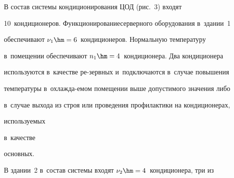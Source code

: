   




  

  В состав системы кондиционирования ЦОД (рис.~3) входят 

10~кондиционеров. Функционирование\linebreak серверного оборудования в~здании~1\linebreak 

обеспечивают $\nu_1\hm = 6$~кондиционеров. Нормальную температуру\linebreak 

в~помещении обес\-пе\-чи\-ва\-ют $n_1\hm = 4$~кондиционера. Два кондиционера

используются в~качестве ре-\linebreak зервных \mbox{и~подключаются} в~случае повышения 

температуры в~охлаж\-да-\linebreak емом помещении выше допустимого значения либо 

в~случае выхода из строя или проведения профилактики на кондиционерах, 

используемых

 в~качестве\hspace*{72.5mm}\linebreak

  основных.\hspace*{72.5mm} 

  

  В здании~2 в~состав системы входят $\nu_2\hm = 4$~кондиционера, три из 

